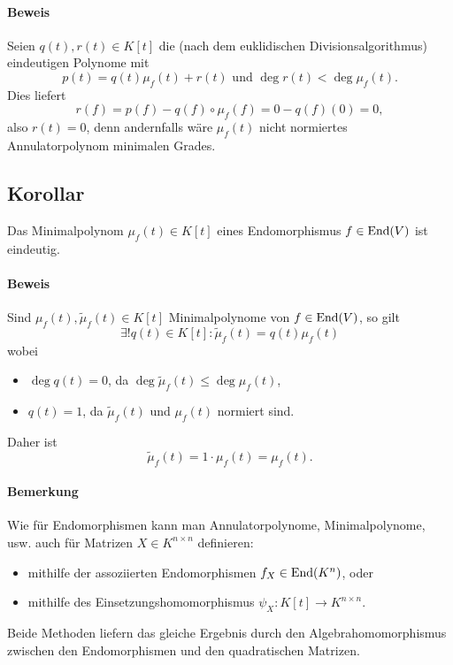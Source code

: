 \paragraph{Beweis}
	Seien $ q(t),r(t)\in K[t] $ die (nach dem euklidischen Divisionsalgorithmus) eindeutigen Polynome mit
		\[ p(t) = q(t)\mu_f(t)+r(t) \text{ und }\deg r(t)<\deg \mu_f(t). \]
	Dies liefert
		\[ r(f) = p(f)-q(f)\circ \mu_f(f) = 0-q(f)(0) = 0, \]
	also $ r(t) = 0 $, denn andernfalls wäre $ \mu_f(t) $ nicht normiertes Annulatorpolynom minimalen Grades.
	
\subsection{Korollar}
\begin{Korollar}
	Das Minimalpolynom $ \mu_f(t)\in K[t] $ eines Endomorphismus $ f\in \operatorname{End}(V) $ ist eindeutig.
\end{Korollar}
\paragraph{Beweis}
	Sind $ \mu_f(t),\tilde{\mu}_f(t)\in K[t] $ Minimalpolynome von $ f\in \operatorname{End}(V) $, so gilt
		\[ \exists! q(t)\in K[t] : \tilde{\mu}_f(t) = q(t)\mu_f(t) \] %
	wobei
		\begin{itemize}
			\item $ \deg q(t) = 0 $, da $ \deg \tilde{\mu}_f(t) \leq \deg \mu_f(t) $,
			\item $ q(t) = 1$, da $ \tilde{\mu}_f(t) $ und $ \mu_f(t) $ normiert sind.
		\end{itemize}
	Daher ist
		\[ \tilde{\mu}_f(t) = 1\cdot \mu_f(t) = \mu_f(t). \]
\paragraph{Bemerkung}
	Wie für Endomorphismen kann man Annulatorpolynome, Minimalpolynome, usw. auch für Matrizen $ X\in K^{n\times n} $ definieren:
		\begin{itemize}
			\item mithilfe der assoziierten Endomorphismen $ f_X\in \operatorname{End}(K^n) $, oder 
			\item mithilfe des Einsetzungshomomorphismus $ \psi_X: K[t] \to K^{n\times n}. $ %
		\end{itemize}
	Beide Methoden liefern das gleiche Ergebnis durch den Algebrahomomorphismus zwischen den Endomorphismen und den quadratischen Matrizen.

